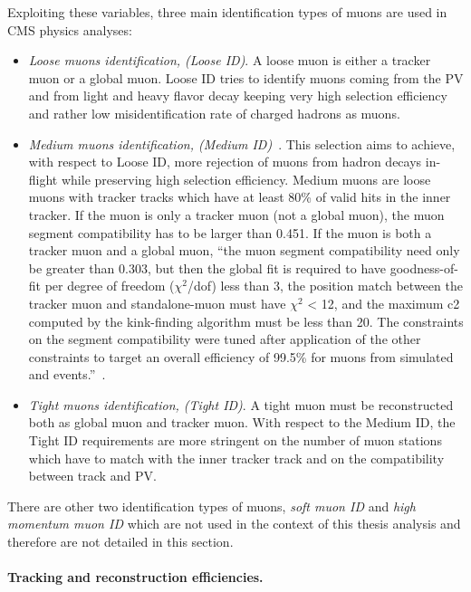Exploiting these variables, three main identification types of muons
are used in CMS physics analyses:
\begin{itemize}
\setlength\itemsep{-0.2em}
\item \emph{Loose muons identification, (Loose ID)}. A loose muon is either a
  tracker muon or a global muon. Loose ID tries to identify muons
  coming from the PV and from light and heavy flavor decay keeping
  very high selection efficiency and rather low misidentification rate
  of charged hadrons as muons. 
\item \emph{Medium muons identification, (Medium
    ID)}~\cite{PetruccianiBotta}. This selection aims to achieve, with
  respect to Loose ID, more rejection	
of muons from hadron decays in-flight while preserving
high selection efficiency. Medium muons are loose muons with tracker
tracks which have at least 80\% of valid hits in the inner tracker. 
If the muon is only a tracker muon (not a global muon), the muon
segment compatibility has to be larger than
0.451. If the muon is both a tracker muon and a global muon, ``the
muon segment compatibility need only be greater than 0.303, but then the global fit
is required to have goodness-of-fit per degree of freedom ($\chi^2$/dof) less than 3, the
position match between the tracker muon and standalone-muon must have $\chi^2$ < 12,
and the maximum c2 computed by the kink-finding algorithm must be less than 20.
The constraints on the segment compatibility were tuned after application of the
other constraints to target an overall efficiency of 99.5\% for muons from simulated
\PW and \PZ events.''~\cite{Sirunyan_2018_muon}.
\item \emph{Tight muons identification, (Tight ID)}. A tight muon must
  be reconstructed both as global muon and tracker muon. With respect
  to the Medium ID, the Tight ID requirements are more stringent on
  the number of muon stations which have to match with the inner
  tracker track and on the compatibility between track and PV. 
\end{itemize}
There are other two identification types of muons, \emph{soft muon ID}
and \emph{high momentum muon ID} which are not used in the context of
this thesis analysis and therefore are not detailed in this section. 


\paragraph{Tracking and reconstruction
  efficiencies.}\label{sec:c2effmuon}

